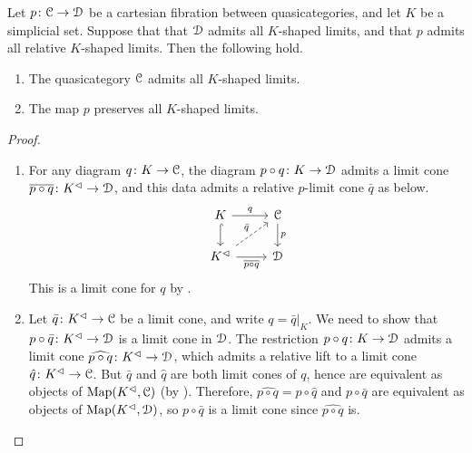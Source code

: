 \documentclass[main.tex]{subfiles}
\begin{document}
\begin{lemma}
  \label{lemma:existence_and_preservation_of_limits}
  Let $p\colon \mathcal{C} \to \mathcal{D}$ be a cartesian fibration between quasicategories, and let $K$ be a simplicial set. Suppose that that $\mathcal{D}$ admits all $K$-shaped limits, and that $p$ admits all relative $K$-shaped limits. Then the following hold.
  \begin{enumerate}
    \item The quasicategory $\mathcal{C}$ admits all $K$-shaped limits.

    \item The map $p$ preserves all $K$-shaped limits.
  \end{enumerate}
\end{lemma}
\begin{proof}
  \begin{enumerate}
    \item For any diagram $q\colon K \to \mathcal{C}$, the diagram $p \circ q\colon K \to \mathcal{D}$ admits a limit cone $\overline{p \circ q}\colon K^{\vartriangleleft} \to \mathcal{D}$, and this data admits a relative $p$-limit cone $\bar{q}$ as below.
      \begin{equation*}
        \begin{tikzcd}
          K
          \arrow[r, "q"]
          \arrow[d, hook]
          & \category{C}
          \arrow[d, "p"]
          \\
          K\cone
          \arrow[r, swap, "\overline{p \circ q}"]
          \arrow[ur, dashed, "\bar{q}"]
          & \category{D}
        \end{tikzcd}
      \end{equation*}
      This is a limit cone for $q$ by \cite[Prop.\ 4.3.1.5]{highertopostheory}.

    \item Let $\bar{q}\colon K^{\vartriangleleft} \to \mathcal{C}$ be a limit cone, and write $q = \bar{q}|_{K}$. We need to show that $p \circ \bar{q}\colon K^{\vartriangleleft} \to \mathcal{D}$ is a limit cone in $\mathcal{D}$. The restriction $p \circ q\colon K \to \mathcal{D}$ admits a limit cone $\widehat{p \circ q}\colon K^{\vartriangleleft} \to \mathcal{D}$, which admits a relative lift to a limit cone $\hat{q}\colon K^{\vartriangleleft} \to \mathcal{C}$. But $\bar{q}$ and $\hat{q}$ are both limit cones of $q$, hence are equivalent as objects of $\mathrm{Map}(K^{\vartriangleleft}, \mathcal{C})$ (by \cite[Prop.\ 4.3.1.5]{highertopostheory}). Therefore, $\widehat{p \circ q} = p \circ \hat{q}$ and $p \circ \bar{q}$ are equivalent as objects of $\mathrm{Map}(K^{\vartriangleleft}, \mathcal{D})$, so $p \circ \bar{q}$ is a limit cone since $\widehat{p \circ q}$ is.
  \end{enumerate}
\end{proof}
\end{document}
